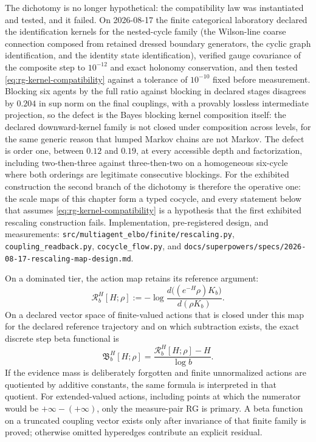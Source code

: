 The dichotomy is no longer hypothetical: the compatibility law was
instantiated and tested, and it failed.  On 2026-08-17 the finite categorical
laboratory declared the identification kernels for the nested-cycle family
(the Wilson-line coarse connection composed from retained dressed boundary
generators, the cyclic graph identification, and the identity state
identification), verified gauge covariance of the composite step to $10^{-12}$
and exact holonomy conservation, and then tested
\eqref{eq:rg-kernel-compatibility} against a tolerance of $10^{-10}$ fixed
before measurement.  Blocking six agents by the full ratio against blocking in
declared stages disagrees by $0.204$ in sup norm on the final couplings, with
a provably lossless intermediate projection, so the defect is the Bayes
blocking kernel composition itself: the declared downward-kernel family is not
closed under composition across levels, for the same generic reason that
lumped Markov chains are not Markov.  The defect is order one, between $0.12$
and $0.19$, at every accessible depth and factorization, including
two-then-three against three-then-two on a homogeneous six-cycle where both
orderings are legitimate consecutive blockings.  For the exhibited
construction the second branch of the dichotomy is therefore the operative
one: the scale maps of this chapter form a typed cocycle, and every statement
below that assumes \eqref{eq:rg-kernel-compatibility} is a hypothesis that the
first exhibited rescaling construction fails.  Implementation, pre-registered
design, and measurements:
\texttt{src/multiagent\_elbo/finite/rescaling.py},
\texttt{coupling\_readback.py}, \texttt{cocycle\_flow.py}, and
\texttt{docs/superpowers/specs/2026-08-17-rescaling-map-design.md}.

On a dominated tier, the action map retains its reference argument:
\begin{equation}
\mathcal R_b^H[H;\rho]
:=-\log\frac{d\bigl((e^{-H}\rho)K_b\bigr)}
{d(\rho K_b)}.
\label{eq:rg-reference-dependent-action-map}
\end{equation}
On a declared vector space of finite-valued actions that is closed under this
map for the declared reference trajectory and on which subtraction exists, the
exact discrete step beta functional is
\begin{equation}
\mathfrak B_b^H[H;\rho]
=\frac{\mathcal R_b^H[H;\rho]-H}{\log b}.
\label{eq:rg-discrete-beta-functional}
\end{equation}
If the evidence mass is deliberately forgotten and finite unnormalized actions
are quotiented by additive constants, the same formula is interpreted in that
quotient.  For extended-valued actions, including points at which the
numerator would be $+\infty-(+\infty)$, only the measure-pair RG is primary.  A beta
function on a truncated coupling vector exists only after invariance of that
finite family is proved; otherwise omitted hyperedges contribute an explicit
residual.  

